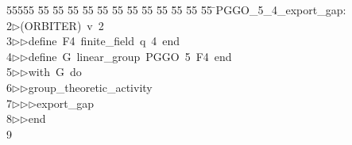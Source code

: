 %
%
\begin{tabbing}
55555 \= 55 \= 55 \= 55 \= 55 \= 55 \= 55 \= 55 \= 55 \= 55 \= 55 \= 55 \= 55 \= \>PGGO\_5\_4\_export\_gap:\\[0pt]
2\>$\triangleright$\>(ORBITER)\ v\ 2\ \\[0pt]
3\>$\triangleright$\>$\triangleright$\>define\ F4\ finite\_field\ q\ 4\ end\ \\[0pt]
4\>$\triangleright$\>$\triangleright$\>define\ G\ linear\_group\ PGGO\ 5\ F4\ end\ \\[0pt]
5\>$\triangleright$\>$\triangleright$\>with\ G\ do\ \\[0pt]
6\>$\triangleright$\>$\triangleright$\>group\_theoretic\_activity\ \\[0pt]
7\>$\triangleright$\>$\triangleright$\>$\triangleright$\>export\_gap\ \\[0pt]
8\>$\triangleright$\>$\triangleright$\>end\\[0pt]
9\>\end{tabbing}
